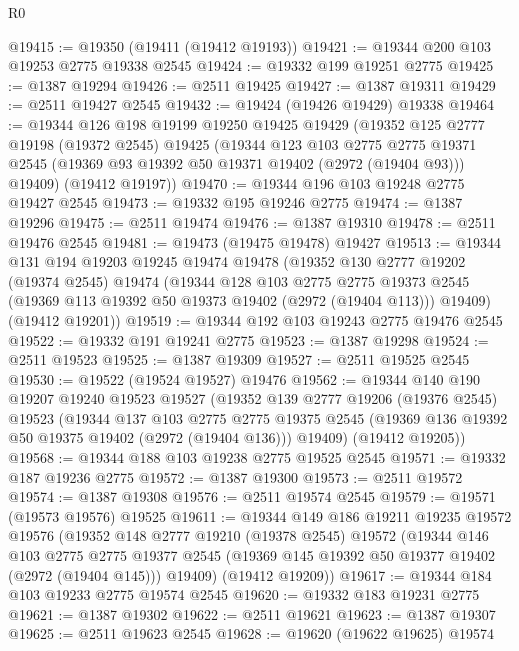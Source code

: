 \begin{lexlean}{R0}
\begin{coremodule}
@19415 := @19350 (@19411 (@19412 @19193))
@19421 := @19344 @200 @103 @19253 @2775 @19338 @2545
@19424 := @19332 @199 @19251 @2775
@19425 := @1387 @19294
@19426 := @2511 @19425
@19427 := @1387 @19311
@19429 := @2511 @19427 @2545
@19432 := @19424 (@19426 @19429) @19338
@19464 := @19344
    @126
    @198
    @19199
    @19250
    @19425
    @19429
    (@19352
      @125
      @2777
      @19198
      (@19372 @2545)
      @19425
      (@19344
        @123
        @103
        @2775
        @2775
        @19371
        @2545
        (@19369 @93 @19392 @50 @19371 @19402 (@2972 (@19404 @93)))
        @19409)
      (@19412 @19197))
@19470 := @19344 @196 @103 @19248 @2775 @19427 @2545
@19473 := @19332 @195 @19246 @2775
@19474 := @1387 @19296
@19475 := @2511 @19474
@19476 := @1387 @19310
@19478 := @2511 @19476 @2545
@19481 := @19473 (@19475 @19478) @19427
@19513 := @19344
    @131
    @194
    @19203
    @19245
    @19474
    @19478
    (@19352
      @130
      @2777
      @19202
      (@19374 @2545)
      @19474
      (@19344
        @128
        @103
        @2775
        @2775
        @19373
        @2545
        (@19369 @113 @19392 @50 @19373 @19402 (@2972 (@19404 @113)))
        @19409)
      (@19412 @19201))
@19519 := @19344 @192 @103 @19243 @2775 @19476 @2545
@19522 := @19332 @191 @19241 @2775
@19523 := @1387 @19298
@19524 := @2511 @19523
@19525 := @1387 @19309
@19527 := @2511 @19525 @2545
@19530 := @19522 (@19524 @19527) @19476
@19562 := @19344
    @140
    @190
    @19207
    @19240
    @19523
    @19527
    (@19352
      @139
      @2777
      @19206
      (@19376 @2545)
      @19523
      (@19344
        @137
        @103
        @2775
        @2775
        @19375
        @2545
        (@19369 @136 @19392 @50 @19375 @19402 (@2972 (@19404 @136)))
        @19409)
      (@19412 @19205))
@19568 := @19344 @188 @103 @19238 @2775 @19525 @2545
@19571 := @19332 @187 @19236 @2775
@19572 := @1387 @19300
@19573 := @2511 @19572
@19574 := @1387 @19308
@19576 := @2511 @19574 @2545
@19579 := @19571 (@19573 @19576) @19525
@19611 := @19344
    @149
    @186
    @19211
    @19235
    @19572
    @19576
    (@19352
      @148
      @2777
      @19210
      (@19378 @2545)
      @19572
      (@19344
        @146
        @103
        @2775
        @2775
        @19377
        @2545
        (@19369 @145 @19392 @50 @19377 @19402 (@2972 (@19404 @145)))
        @19409)
      (@19412 @19209))
@19617 := @19344 @184 @103 @19233 @2775 @19574 @2545
@19620 := @19332 @183 @19231 @2775
@19621 := @1387 @19302
@19622 := @2511 @19621
@19623 := @1387 @19307
@19625 := @2511 @19623 @2545
@19628 := @19620 (@19622 @19625) @19574

\end{coremodule}
\end{lexlean}
